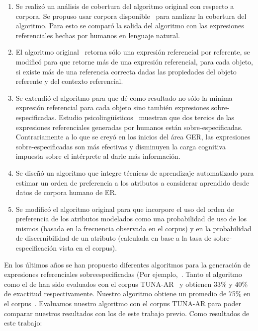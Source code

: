 \begin{enumerate}
   \item Se realiz\'o un an\'alisis de cobertura del algoritmo original con respecto a corpora. Se propuso usar corpora disponible~\cite{viethen-dale:2011:UCNLG+Eval} para analizar la cobertura del algoritmo. Para esto se compar\'o la salida del algoritmo con las expresiones referenciales hechas por humanos en lenguaje natural. 
   \item El algoritmo original~\cite{Areces2008} retorna s\'olo una expresi\'on referencial por referente, se modific\'o para que retorne m\'as de una expresi\'on referencial, para cada objeto, si existe m\'as de una referencia correcta dadas las propiedades del objeto referente y del contexto referencial.
   \item Se extendi\'o el algoritmo para que d\'e como resultado no s\'olo la m\'inima expresi\'on referencial para cada objeto sino tambi\'en expresiones sobre-especificadas. Estudio psicoling\"u\'isticos~\cite{keysar:Curr98} muestran que dos tercios de las expresiones referenciales generadas por humanos est\'an sobre-especificadas. Contrariamente a lo que se crey\'o en los inicios del \'area GER, las expresiones sobre-especificadas son m\'as efectivas y disminuyen la carga cognitiva impuesta sobre el int\'erprete al darle m\'as informaci\'on. 
   \item Se dise\~n\'o un algoritmo que integre t\'ecnicas de aprendizaje automatizado para estimar un orden de preferencia a los atributos a considerar aprendido desde datos de corpora humano de ER.
   \item Se modific\'o el algoritmo original para que incorpore el uso del orden de preferencia de los atributos modelados como una probabilidad de uso de los mismos (basada en la frecuencia observada en el corpus) y en la probabilidad de discernibilidad de un atributo (calculada en base a la tasa de sobre-especificaci\'on vista en el corpus).
\end{enumerate}

En los \'ultimos a\~nos se han propuesto diferentes algoritmos para la generaci\'on de expresiones referenciales sobreespecificadas (Por ejemplo,~\cite{ruudINLG2012}. Tanto el algoritmo~\cite{delucenaENLG} como el de \cite{ruudINLG2012} han sido evaluados con el corpus TUNA-AR~\cite{gattENLG} y obtienen 33\% y 40\% de exactitud respectivamente. Nuestro algoritmo obtiene un promedio de 75\% en el corpus~\cite{viethen-dale:2011:UCNLG+Eval}. Evaluamos nuestro algoritmo con el corpus TUNA-AR para poder comparar nuestros resultados con los de este trabajo previo. Como resultados de este trabajo:

